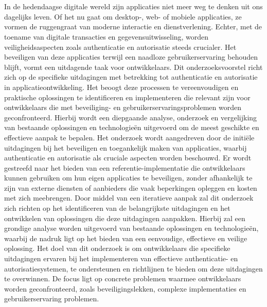 
\chapter{}%
\label{ch:inleiding}

In de hedendaagse digitale wereld zijn applicaties niet meer weg te denken uit ons dagelijks leven. Of het nu gaat om desktop-, web- of mobiele applicaties, ze vormen de ruggengraat van moderne interactie 
en dienstverlening. Echter, met de toename van digitale transacties en gegevensuitwisseling, worden veiligheidsaspecten zoals authenticatie en autorisatie steeds crucialer. Het beveiligen van deze applicaties 
terwijl een naadloze gebruikerservaring behouden blijft, vormt een uitdagende taak voor ontwikkelaars.
\newline
\newline
Dit onderzoeksvoorstel richt zich op de specifieke uitdagingen met betrekking tot authenticatie en autorisatie in applicatieontwikkeling. Het beoogt deze processen te vereenvoudigen en praktische oplossingen 
te identificeren en implementeren die relevant zijn voor ontwikkelaars die met beveiliging- en gebruikerservaringsproblemen worden geconfronteerd. Hierbij wordt een diepgaande analyse, onderzoek en 
vergelijking van bestaande oplossingen en technologieën uitgevoerd om de meest geschikte en effectieve aanpak te bepalen.
\newline
\newline
Het onderzoek wordt aangedreven door de initiële uitdagingen bij het beveiligen en toegankelijk maken van applicaties, waarbij authenticatie en autorisatie als cruciale aspecten worden beschouwd. 
Er wordt gestreefd naar het bieden van een referentie-implementatie die ontwikkelaars kunnen gebruiken om hun eigen applicaties te beveiligen, zonder afhankelijk te zijn van externe diensten of aanbieders die vaak beperkingen opleggen en kosten met zich meebrengen.
\newline
\newline
Door middel van een iteratieve aanpak zal dit onderzoek zich richten op het identificeren van de belangrijkste uitdagingen en het ontwikkelen van oplossingen die deze uitdagingen aanpakken. 
Hierbij zal een grondige analyse worden uitgevoerd van bestaande oplossingen en technologieën, waarbij de nadruk ligt op het bieden van een eenvoudige, effectieve en veilige oplossing.
\newline
\newline
Het doel van dit onderzoek is om ontwikkelaars die specifieke uitdagingen ervaren bij het implementeren van effectieve authenticatie- en autorisatiesystemen, te ondersteunen en richtlijnen te bieden om deze uitdagingen te overwinnen.
De focus ligt op concrete problemen waarmee ontwikkelaars worden geconfronteerd, zoals beveiligingslekken, complexe implementaties en gebruikerservaring problemen.


